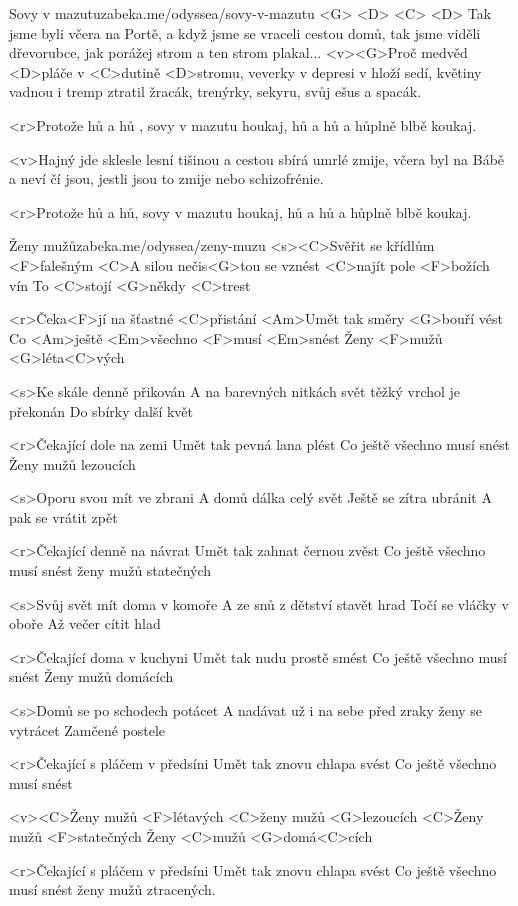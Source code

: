 \begin{song}{56}{Sovy v mazutu}{zabeka.me/odyssea/sovy-v-mazutu}
	<G> <D> <C> <D>
	Tak jsme byli včera na Portě, a když jsme se vraceli cestou domů,
	tak jsme viděli dřevorubce, jak porážej strom a ten strom plakal...
	<v><G>Proč medvěd <D>pláče v <C>dutině <D>stromu, veverky v depresi v hloží sedí,
	květiny vadnou i tremp ztratil žracák, trenýrky, sekyru, svůj ešus a spacák.

	<r>Protože hů a hů , sovy v mazutu houkaj,
	hů a hů a hůplně blbě koukaj.

	<v>Hajný jde sklesle lesní tišinou a cestou sbírá umrlé zmije,
	včera byl na Bábě a neví čí jsou, jestli jsou to zmije nebo schizofrénie.

	<r>Protože hů a hů, sovy v mazutu houkaj,
	hů a hů a hůplně blbě koukaj.
\end{song}
\begin{song}[Epydemye]{57}{Ženy mužů}{zabeka.me/odyssea/zeny-muzu}
	<s><C>Svěřit se křídlům <F>falešným
	<C>A silou nečis<G>tou se vznést
	<C>najít pole <F>božích vín
	To <C>stojí <G>někdy <C>trest

	<r>Čeka<F>jí na šťastné <C>přistání
	<Am>Umět tak směry <G>bouří vést
	Co <Am>ještě <Em>všechno <F>musí <Em>snést
	Ženy <F>mužů <G>léta<C>vých

	<s>Ke skále denně přikován
	A na barevných nitkách svět
	těžký vrchol je překonán
	Do sbírky další květ

	<r>Čekající dole na zemi
	Umět tak pevná lana plést
	Co ještě všechno musí snést
	Ženy mužů lezoucích

	<s>Oporu svou mít ve zbrani
	A domů dálka celý svět
	Ještě se zítra ubránit
	A pak se vrátit zpět

	<r>Čekající denně na návrat
	Umět tak zahnat černou zvěst
	Co ještě všechno musí snést
	ženy mužů statečných

	<s>Svůj svět mít doma v komoře
	A ze snů z dětství stavět hrad
	Točí se vláčky v oboře
	Až večer cítit hlad

	<r>Čekající doma v kuchyni
	Umět tak nudu prostě smést
	Co ještě všechno musí snést
	Ženy mužů domácích

	<s>Domů se po schodech potácet
	A nadávat už i na sebe
	před zraky ženy se vytrácet
	Zamčené postele

	<r>Čekající s pláčem v předsíni
	Umět tak znovu chlapa svést
	Co ještě všechno musí snést

	<v><C>Ženy mužů <F>létavých
	<C>ženy mužů <G>lezoucích
	<C>Ženy mužů <F>statečných
	Ženy <C>mužů <G>domá<C>cích

	<r>Čekající s pláčem v předsíni
	Umět tak znovu chlapa svést
	Co ještě všechno musí snést
	ženy mužů ztracených.
\end{song}
